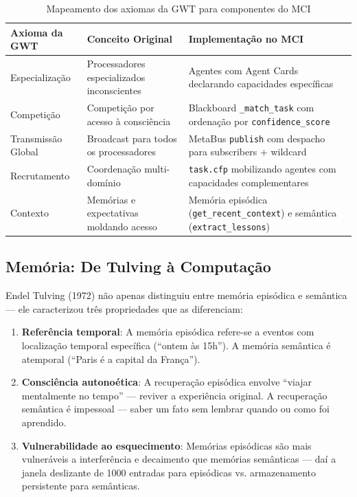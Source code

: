 \begin{table}[htbp]
\centering
\caption{Mapeamento dos axiomas da GWT para componentes do MCI}
\label{tab:gwt-mapping}
\begin{tabular}{@{}p{3.5cm}p{5cm}p{5cm}@{}}
\toprule
\textbf{Axioma da GWT} & \textbf{Conceito Original} & \textbf{Implementação no MCI} \\
\midrule
Especialização & Processadores especializados inconscientes & Agentes com Agent Cards declarando capacidades específicas \\
Competição & Competição por acesso à consciência & Blackboard \texttt{\_match\_task} com ordenação por \texttt{confidence\_score} \\
Transmissão Global & Broadcast para todos os processadores & MetaBus \texttt{publish} com despacho para subscribers + wildcard \\
Recrutamento & Coordenação multi-domínio & \texttt{task.cfp} mobilizando agentes com capacidades complementares \\
Contexto & Memórias e expectativas moldando acesso & Memória episódica (\texttt{get\_recent\_context}) e semântica (\texttt{extract\_lessons}) \\
\bottomrule
\end{tabular}
\end{table}

\subsection{Memória: De Tulving à Computação}

Endel Tulving (1972) \cite{Tulving1972_Episodic} não apenas distinguiu entre memória episódica e semântica — ele caracterizou três propriedades que as diferenciam:

\begin{enumerate}
    \item \textbf{Referência temporal}: A memória episódica refere-se a eventos com localização temporal específica (``ontem às 15h''). A memória semântica é atemporal (``Paris é a capital da França'').
    
    \item \textbf{Consciência autonoética}: A recuperação episódica envolve ``viajar mentalmente no tempo'' — reviver a experiência original. A recuperação semântica é impessoal — saber um fato sem lembrar quando ou como foi aprendido.
    
    \item \textbf{Vulnerabilidade ao esquecimento}: Memórias episódicas são mais vulneráveis a interferência e decaimento que memórias semânticas — daí a janela deslizante de 1000 entradas para episódicas vs. armazenamento persistente para semânticas.
\end{enumerate}

